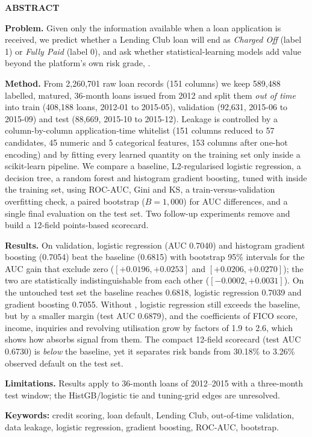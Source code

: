 \begin{center}{\bfseries\LARGE ABSTRACT}\end{center}
\vspace{1em}

\noindent\textbf{Problem.} Given only the information available when a loan application is received, we predict whether a Lending Club loan will end as \emph{Charged Off} (label 1) or \emph{Fully Paid} (label 0), and ask whether statistical-learning models add value beyond the platform's own risk grade, .

\noindent\textbf{Method.} From 2,260,701 raw loan records (151 columns) we keep 589,488 labelled, matured, 36-month loans issued from 2012 and split them \emph{out of time} into train (408,188 loans, 2012-01 to 2015-05), validation (92,631, 2015-06 to 2015-09) and test (88,669, 2015-10 to 2015-12). Leakage is controlled by a column-by-column application-time whitelist (151 columns reduced to 57 candidates, 45 numeric and 5 categorical features, 153 columns after one-hot encoding) and by fitting every learned quantity on the training set only inside a scikit-learn pipeline. We compare a  baseline, L2-regularised logistic regression, a decision tree, a random forest and histogram gradient boosting, tuned with  inside the training set, using ROC-AUC, Gini and KS, a train-versus-validation overfitting check, a paired bootstrap ($B=1{,}000$) for AUC differences, and a single final evaluation on the test set. Two follow-up experiments remove  and build a 12-field points-based scorecard.

\noindent\textbf{Results.} On validation, logistic regression (AUC 0.7040) and histogram gradient boosting (0.7054) beat the  baseline (0.6815) with bootstrap 95\% intervals for the AUC gain that exclude zero ($[+0.0196,+0.0253]$ and $[+0.0206,+0.0270]$); the two are statistically indistinguishable from each other ($[-0.0002,+0.0031]$). On the untouched test set the baseline reaches 0.6818, logistic regression 0.7039 and gradient boosting 0.7055. Without , logistic regression still exceeds the baseline, but by a smaller margin (test AUC 0.6879), and the coefficients of FICO score, income, inquiries and revolving utilisation grow by factors of 1.9 to 2.6, which shows how  absorbs signal from them. The compact 12-field scorecard (test AUC 0.6730) is \emph{below} the baseline, yet it separates risk bands from 30.18\% to 3.26\% observed default on the test set.

\noindent\textbf{Limitations.} Results apply to 36-month loans of 2012--2015 with a three-month test window; the HistGB/logistic tie and tuning-grid edges are unresolved.

\medskip
\noindent\textbf{Keywords:} credit scoring, loan default, Lending Club, out-of-time validation, data leakage, logistic regression, gradient boosting, ROC-AUC, bootstrap.

